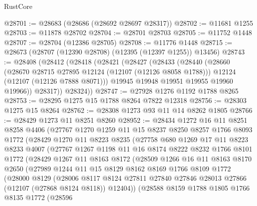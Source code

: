 \begin{lexlean}{RustCore}
\begin{coremodule}
@28701 := @28683 (@28686 (@28692 @28697 @28317))
@28702 := @11681 @1255
@28703 := @11878 @28702
@28704 := @28701 @28703
@28705 := @11752 @1448
@28707 := @28704 (@12386 @28705)
@28708 := @11776 @1448
@28715 := @28673 (@28707 (@12390 @28708) (@12395 (@12397 @1255)) @13456)
@28743 := @28408
    (@28412
      (@28418
        (@28421
          (@28427
            (@28433
              (@28440
                (@28660
                  (@28670 @28715 @27895 @12124 (@12107 (@12126 @8058 @1788)))
                  @12124
                  (@12107 (@12126 @7888 @8071)))
                @19945
                @19948
                @19951
                @19955
                @19960
                @19966))
            @28317))
        @28324))
@28747 := @27928 @1276 @1192 @1788 @8265
@28753 := @28295 @1275 @15 @1788 @8264 @7822 @12318
@28756 := @28303 @1275 @15 @8264
@28762 := @28308 @1273 @93 @11 @14 @8262 @1805
@28766 := @28429 @1273 @11 @8251 @8260
@28952 := @28434
    @1272
    @16
    @11
    @8251
    @8258
    @4406
    (@27767
      @1270
      @1259
      @11
      @15
      @8237
      @8250
      @8257
      @1766
      @8093
      @1772
      (@28429
        @1270
        @11
        @8223
        @8235
        (@27758
          @680
          @1269
          @17
          @11
          @8223
          @8233
          @4007
          (@27767
            @1267
            @1198
            @11
            @16
            @8174
            @8222
            @8232
            @1766
            @8101
            @1772
            (@28429
              @1267
              @11
              @8163
              @8172
              (@28509
                @1266
                @16
                @11
                @8163
                @8170
                @2650
                (@27989
                  @1244
                  @11
                  @15
                  @8129
                  @8162
                  @8169
                  @1766
                  @8109
                  @1772
                  (@28000
                    @8129
                    (@28006
                      @8117
                      @8124
                      @27811
                      @27840
                      @27846
                      @28013
                      @27866
                      (@12107 (@27868 @8124 @8118))
                      @12404))
                  (@28588
                    @8159
                    @1788
                    @1805
                    @1766
                    @8135
                    @1772
                    (@28596

\end{coremodule}
\end{lexlean}
